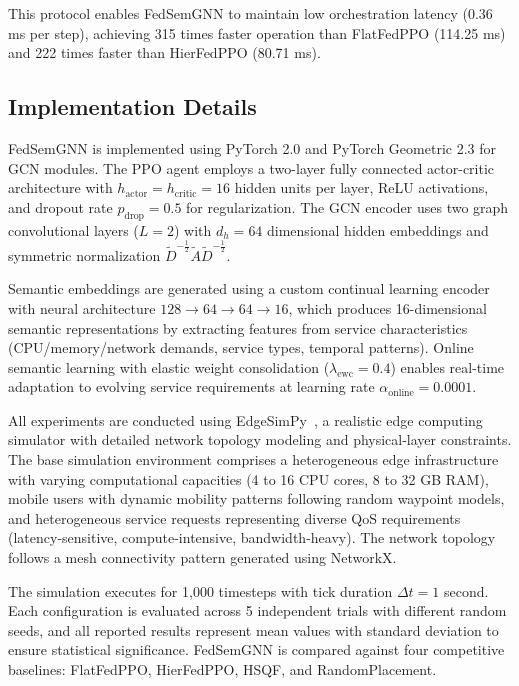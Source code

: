 \documentclass[conference]{IEEEtran}
\begin{document}
		This protocol enables FedSemGNN to maintain low orchestration latency (0.36 ms per step), achieving 315 times faster operation than FlatFedPPO (114.25 ms) and 222 times faster than HierFedPPO (80.71 ms).
		
		\subsection{Implementation Details}
		FedSemGNN is implemented using PyTorch 2.0 and PyTorch Geometric 2.3 for GCN modules. The PPO agent employs a two-layer fully connected actor-critic architecture with $h_{\text{actor}} = h_{\text{critic}} = 16$ hidden units per layer, ReLU activations, and dropout rate $p_{\text{drop}} = 0.5$ for regularization. The GCN encoder uses two graph convolutional layers ($L = 2$) with $d_h = 64$ dimensional hidden embeddings and symmetric normalization $\tilde{D}^{-\frac{1}{2}} \tilde{A} \tilde{D}^{-\frac{1}{2}}$.
		
		Semantic embeddings are generated using a custom continual learning encoder with neural architecture $128 \rightarrow 64 \rightarrow 64 \rightarrow 16$, which produces 16-dimensional semantic representations by extracting features from service characteristics (CPU/memory/network demands, service types, temporal patterns). Online semantic learning with elastic weight consolidation ($\lambda_{\text{ewc}} = 0.4$) enables real-time adaptation to evolving service requirements at learning rate $\alpha_{\text{online}} = 0.0001$.
		
		All experiments are conducted using EdgeSimPy~\cite{souza2023edgesimpy}, a realistic edge computing simulator with detailed network topology modeling and physical-layer constraints. The base simulation environment comprises a heterogeneous edge infrastructure with varying computational capacities (4 to 16 CPU cores, 8 to 32 GB RAM), mobile users with dynamic mobility patterns following random waypoint models, and heterogeneous service requests representing diverse QoS requirements (latency-sensitive, compute-intensive, bandwidth-heavy). The network topology follows a mesh connectivity pattern generated using NetworkX.
		
		The simulation executes for 1,000 timesteps with tick duration $\Delta t = 1$ second. Each configuration is evaluated across 5 independent trials with different random seeds, and all reported results represent mean values with standard deviation to ensure statistical significance. FedSemGNN is compared against four competitive baselines: FlatFedPPO, HierFedPPO, HSQF, and RandomPlacement.
		
\end{document}
